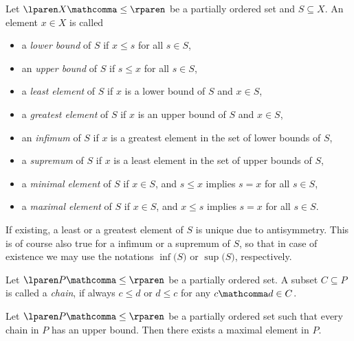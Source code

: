 \begin{definition}
\label{def:ordered_elements}
  Let
  $\lparen X \mathcomma \leq \rparen$
  be a partially ordered set and
  $S \subseteq X$.
  An element $x \in X$ is called
  \begin{itemize}
    \item a \emph{lower bound} of $S$ if
    $x \leq s$ for all $s \in S$,
    \item an \emph{upper bound} of $S$ if
    $s \leq x$ for all $s \in S$,
    \item a \emph{least element} of $S$ if
    $x$ is a lower bound of $S$ and $x \in S$,
    \item a \emph{greatest element} of $S$ if
    $x$ is an upper bound of $S$ and $x \in S$,
    \item an \emph{infimum} of $S$ if
    $x$ is a greatest element in the set of lower bounds of $S$,
    \item a \emph{supremum} of $S$ if
    $x$ is a least element in the set of upper bounds of $S$,
    \item a \emph{minimal element} of $S$ if
    $x \in S$, and $s \leq x$ implies $s \equal x$ for all $s \in S$,
    \item a \emph{maximal element} of $S$ if
    $x \in S$, and $x \leq s$ implies $s \equal x$ for all $s \in S$.
  \end{itemize}

\begin{remark}
  If existing,
  a least or a greatest element of $S$ is unique due to antisymmetry.
  This is of course also true for a infimum or a supremum of $S$,
  so that in case of existence we may use the notations
  $\inf \lparen S \rparen$ or $\sup \lparen S \rparen$, respectively.
\end{remark}

\begin{definition}
  Let $\lparen P \mathcomma \leq \rparen$ be a partially ordered set.
  A subset $C \subseteq P$ is called a \emph{chain},
  if always $c \leq d$ or $d \leq c$ for any $c \mathcomma d \in C$.
\end{definition}

\begin{theorem}
\label{thm:zorn}
  Let $\lparen P \mathcomma \leq \rparen$ be a partially ordered set
  such that every chain in $P$ has an upper bound.
  Then there exists a maximal element in $P$.
\end{theorem}

\end{definition}

